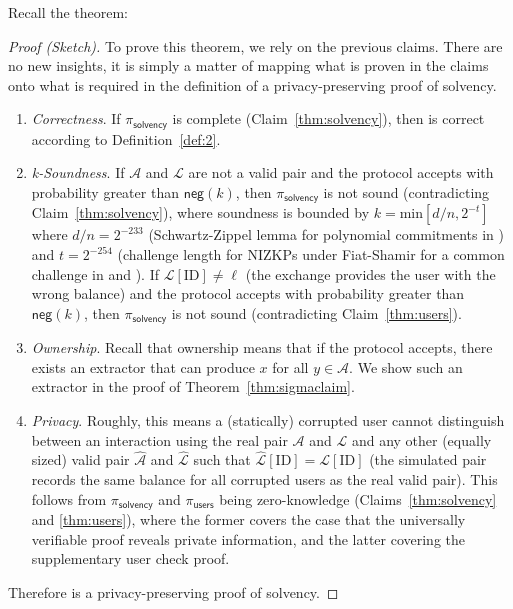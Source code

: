 Recall the theorem:

\thmmaster*

\begin{proof}[Proof (Sketch)] To prove this theorem, we rely on the previous claims. There are no new insights, it is simply a matter of mapping what is proven in the claims onto what is required in the definition of a privacy-preserving proof of solvency.

\begin{enumerate}
\item \textit{Correctness}. If $\pi_\mathsf{solvency}$ is complete (Claim~\ref{thm:solvency}), then \Sys is correct according to Definition~\ref{def:2}.

\item \textit{k-Soundness}. If $\mathcal{A}$ and $\mathcal{L}$ are not a valid pair and the protocol accepts with probability greater than $\mathsf{neg}(k)$, then $\pi_\mathsf{solvency}$ is not sound (contradicting Claim~\ref{thm:solvency}), where soundness is bounded by $k=\mathrm{min}[d/n,2^{-t}]$ where $d/n=2^{-233}$ (Schwartz-Zippel lemma for polynomial commitments in \bls) and $t=2^{-254}$ (challenge length for NIZKPs under Fiat-Shamir for a common challenge in \secp and \bls). If $\mathcal{L}[\text{ID}] \neq \ell$ (\ie the exchange provides the user with the wrong balance) and the protocol accepts with probability greater than $\mathsf{neg}(k)$, then $\pi_\mathsf{solvency}$ is not sound (contradicting Claim~\ref{thm:users}).

\item \textit{Ownership}. Recall that ownership means that if the protocol accepts, there exists an extractor that can produce $x$ for all $y \in \mathcal{A}$. We show such an extractor in the proof of Theorem~\ref{thm:sigmaclaim}.

\item \textit{Privacy}. Roughly, this means a (statically) corrupted user cannot distinguish between an interaction using the real pair $\mathcal{A}$ and $\mathcal{L}$ and any other (equally sized) valid pair $\hat{\mathcal{A}}$ and $\hat{\mathcal{L}}$ such that $\hat{\mathcal{L}}[\text{ID}] = \mathcal{L}[\text{ID}]$ (\ie the simulated pair records the same balance for all corrupted users as the real valid pair). This follows from $\pi_\mathsf{solvency}$ and $\pi_\mathsf{users}$ being zero-knowledge (Claims~\ref{thm:solvency} and \ref{thm:users}), where the former covers the case that the universally verifiable proof reveals private information, and the latter covering the supplementary user check proof. 
\end{enumerate} 

Therefore \Sys is a privacy-preserving proof of solvency.\end{proof}






